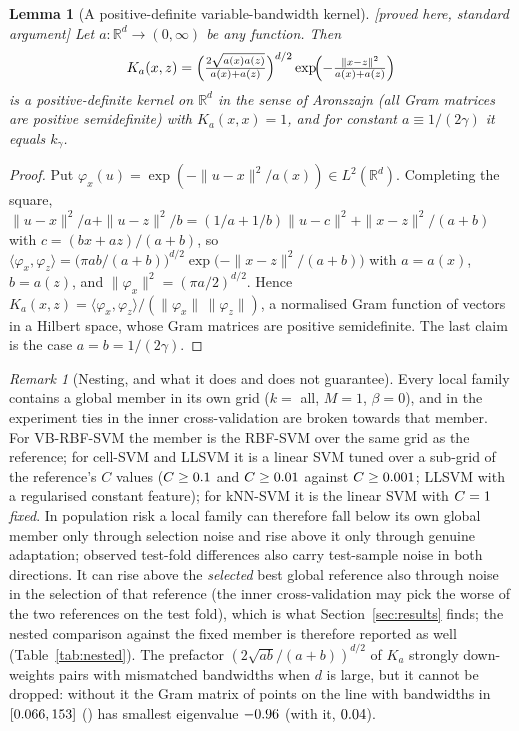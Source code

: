 \documentclass[11pt,a4paper]{article}
\theoremstyle{plain}
\newtheorem{lemma}[theorem]{Lemma}
\theoremstyle{definition}
\theoremstyle{remark}
\newtheorem{remark}[theorem]{Remark}
\newcommand{\R}{\mathbb{R}}
\newcommand{\status}[1]{\textsf{\small [#1]}}
\begin{document}
\begin{lemma}[A positive-definite variable-bandwidth kernel]\label{lem:pd}\status{proved here, standard argument}
Let $a\colon\R^d\to(0,\infty)$ be any function. Then
\[
K_a(x,z)=\Bigl(\tfrac{2\sqrt{a(x)a(z)}}{a(x)+a(z)}\Bigr)^{d/2}\exp\!\Bigl(-\tfrac{\|x-z\|^2}{a(x)+a(z)}\Bigr)
\]
is a positive-definite kernel on $\R^d$ in the sense of Aronszajn (all Gram matrices are positive semidefinite) with $K_a(x,x)=1$, and for constant $a\equiv 1/(2\gamma)$ it equals $k_\gamma$.
\end{lemma}
\begin{proof}
Put $\varphi_x(u)=\exp(-\|u-x\|^2/a(x))\in L^2(\R^d)$. Completing the square, $\|u-x\|^2/a+\|u-z\|^2/b=(1/a+1/b)\|u-c\|^2+\|x-z\|^2/(a+b)$ with $c=(bx+az)/(a+b)$, so
\(
\langle\varphi_x,\varphi_z\rangle=\bigl(\pi ab/(a+b)\bigr)^{d/2}\exp\bigl(-\|x-z\|^2/(a+b)\bigr)
\)
with $a=a(x)$, $b=a(z)$, and $\|\varphi_x\|^2=(\pi a/2)^{d/2}$. Hence $K_a(x,z)=\langle\varphi_x,\varphi_z\rangle/(\|\varphi_x\|\,\|\varphi_z\|)$, a normalised Gram function of vectors in a Hilbert space, whose Gram matrices are positive semidefinite. The last claim is the case $a=b=1/(2\gamma)$.
\end{proof}

\begin{remark}[Nesting, and what it does and does not guarantee]\label{rem:nesting}
Every local family contains a global member in its own grid ($k=$ all, $M=1$, $\beta=0$), and in the experiment ties in the inner cross-validation are broken towards that member. For VB-RBF-SVM the member is the RBF-SVM over the same grid as the reference; for cell-SVM and LLSVM it is a linear SVM tuned over a sub-grid of the reference's $C$ values ($C\ge0.1$ and $C\ge0.01$ against $C\ge0.001$; LLSVM with a regularised constant feature); for kNN-SVM it is the linear SVM with $C=1$ \emph{fixed}. In population risk a local family can therefore fall below its own global member only through selection noise and rise above it only through genuine adaptation; observed test-fold differences also carry test-sample noise in both directions. It can rise above the \emph{selected} best global reference also through noise in the selection of that reference (the inner cross-validation may pick the worse of the two references on the test fold), which is what Section~\ref{sec:results} finds; the nested comparison against the fixed member is therefore reported as well (Table~\ref{tab:nested}). The prefactor $(2\sqrt{ab}/(a+b))^{d/2}$ of $K_a$ strongly down-weights pairs with mismatched bandwidths when $d$ is large, but it cannot be dropped: without it the Gram matrix of \ExPrefreeN{} points on the line with bandwidths in $[0.066,153]$ () has smallest eigenvalue $-0.96$ (with it, $0.04$).
\end{remark}
\end{document}
